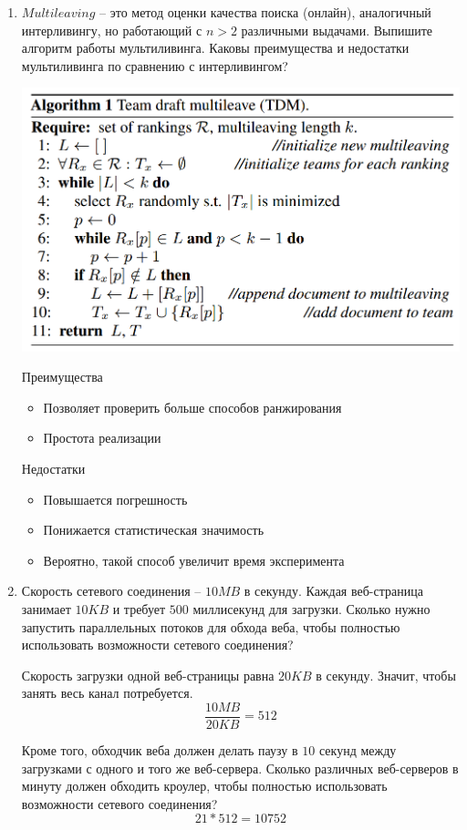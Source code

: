 \begin{enumerate}
	\item $Multileaving$ – это метод оценки качества поиска (онлайн), аналогичный 
	интерливингу, но работающий с $n > 2$ различными выдачами. Выпишите алгоритм работы 
	мультиливинга. Каковы преимущества и недостатки мультиливинга по сравнению с 
	интерливингом?
	
	\includegraphics[scale=0.38]{ha/img/multileaving.PNG}
	
	Преимущества
	\begin{itemize}
		\item Позволяет проверить больше способов ранжирования
		\item Простота реализации
	\end{itemize}
	Недостатки
	\begin{itemize}
		\item Повышается погрешность
		\item Понижается статистическая значимость
		\item Вероятно, такой способ увеличит время эксперимента
	\end{itemize}
	
	\item Скорость сетевого соединения – $10MB$ в секунду. Каждая веб-страница занимает 
	$10KB$ и требует $500$ миллисекунд для загрузки. Сколько нужно запустить параллельных 
	потоков для обхода веба, чтобы полностью использовать возможности сетевого соединения?
	
	Скорость загрузки одной веб-страницы равна $20KB$ в секунду. Значит, чтобы занять весь канал потребуется.
	\begin{equation*}
		\frac{10MB}{20KB} = 512 
	\end{equation*}

	Кроме того, обходчик веба должен делать паузу в $10$ секунд между загрузками с одного и 
	того же веб-сервера. Сколько различных веб-серверов в минуту должен обходить кроулер, 
	чтобы полностью использовать возможности сетевого соединения?
	\begin{equation*}
		21 * 512 = 10752
	\end{equation*}


\end{enumerate}
